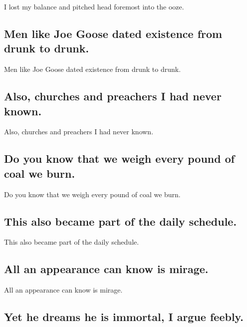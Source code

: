 \documentclass[]{article}
\begin{document}
I lost my balance and pitched head foremost into the ooze.

\hypertarget{men-like-joe-goose-dated-existence-from-drunk-to-drunk.}{%
\subsection{Men like Joe Goose dated existence from drunk to
drunk.}\label{men-like-joe-goose-dated-existence-from-drunk-to-drunk.}}

Men like Joe Goose dated existence from drunk to drunk.

\hypertarget{also-churches-and-preachers-i-had-never-known.}{%
\subsection{Also, churches and preachers I had never
known.}\label{also-churches-and-preachers-i-had-never-known.}}

Also, churches and preachers I had never known.

\hypertarget{do-you-know-that-we-weigh-every-pound-of-coal-we-burn.}{%
\subsection{Do you know that we weigh every pound of coal we
burn.}\label{do-you-know-that-we-weigh-every-pound-of-coal-we-burn.}}

Do you know that we weigh every pound of coal we burn.

\hypertarget{this-also-became-part-of-the-daily-schedule.}{%
\subsection{This also became part of the daily
schedule.}\label{this-also-became-part-of-the-daily-schedule.}}

This also became part of the daily schedule.

\hypertarget{all-an-appearance-can-know-is-mirage.}{%
\subsection{All an appearance can know is
mirage.}\label{all-an-appearance-can-know-is-mirage.}}

All an appearance can know is mirage.

\hypertarget{yet-he-dreams-he-is-immortal-i-argue-feebly.}{%
\subsection{Yet he dreams he is immortal, I argue
feebly.}\label{yet-he-dreams-he-is-immortal-i-argue-feebly.}}
\end{document}
